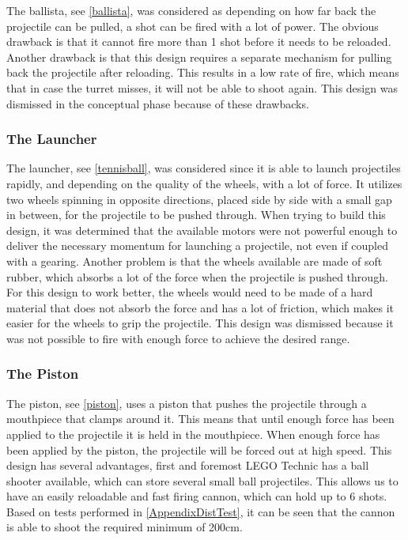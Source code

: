 The ballista, see \autoref{ballista}, was considered as depending on how far
back the projectile can be pulled, a shot can be fired with a lot of power. The
obvious drawback is that it cannot fire more than 1 shot before it needs to be
reloaded. Another drawback is that this design requires a separate mechanism for
pulling back the projectile after reloading. This results in a low rate of fire,
which means that in case the turret misses, it will not be able to shoot again.
This design was dismissed in the conceptual phase because of these drawbacks.

\subsubsection{The Launcher}

The launcher, see \autoref{tennisball}, was considered since it is able to
launch projectiles rapidly, and depending on the quality of the wheels, with a
lot of force. It utilizes two wheels spinning in opposite directions, placed
side by side with a small gap in between, for the projectile to be pushed
through. When trying to build this design, it was determined that the available
motors were not powerful enough to deliver the necessary momentum for launching
a projectile, not even if coupled with a gearing. Another problem is that the
wheels available are made of soft rubber, which absorbs a lot of the force when the
projectile is pushed through. For this design to work better, the wheels would
need to be made of a hard material that does not absorb the force and has a lot
of friction, which makes it easier for the wheels to grip the projectile. This
design was dismissed because it was not possible to fire with enough force to
achieve the desired range.
\subsubsection{The Piston}

The piston, see \autoref{piston}, uses a piston that pushes the
projectile through a mouthpiece that clamps around it. This means that until
enough force has been applied to the projectile it is held in the mouthpiece.
When enough force has been applied by the piston, the projectile will be forced
out at high speed. This design has several advantages, first and foremost LEGO
Technic has a ball shooter available, which can store several small ball
projectiles. This allows us to have an easily reloadable and fast firing cannon,
which can hold up to 6 shots. Based on tests performed in
\autoref{AppendixDistTest}, it can be seen that the cannon is able to shoot the
required minimum of 200cm.


